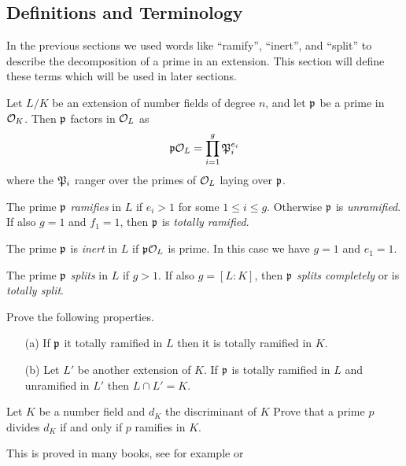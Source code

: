 \subsection{Definitions and Terminology}

In the previous sections we used words like ``ramify'',
``inert'', and ``split'' to describe the decomposition
of a prime in an extension. This section will define these
terms which will be used in later sections.

Let $L/K$ be an extension of number fields of degree $n$,
and let $\p$ be a prime in $\sO_K$. Then $\p$ factors in $\sO_L$ as
\[
  \p\sO_L = \prod_{i=1}^g \P_i^{e_i}
\]
where the $\P_i$ ranger over the primes of $\sO_L$ laying over $\p$.

\begin{definition}\label{def:ramify}
  The prime $\p$ \emph{ramifies} in $L$ if $e_i > 1$ for some $1\leq i\leq g$.
  Otherwise $\p$ is \emph{unramified}.
  If also $g = 1$ and $f_1 = 1$, then $\p$ is \emph{totally ramified}.
\end{definition}

\begin{definition}\label{def:inert}
  The prime $\p$ is \emph{inert} in $L$ if $\p\sO_L$ is prime.
  In this case we have $g = 1$ and $e_1 = 1$.
\end{definition}

\begin{definition}\label{def:split}
  The prime $\p$ \emph{splits} in $L$ if $g > 1$. If also $g = [L : K]$,
  then $\p$ \emph{splits completely} or is \emph{totally split}.
\end{definition}

\begin{exercise}
  Prove the following properties.
  \begin{enumerate}
    \item[(a)] If $\p$ it totally ramified in $L$
    then it is totally ramified in $K$.

    \item[(b)] Let $L'$ be another extension of $K$.
    If $\p$ is totally ramified in $L$ and unramified in $L'$
    then $L\cap L' = K$.
  \end{enumerate}
\end{exercise}

\begin{exercise}
  Let $K$ be a number field and $d_K$ the discriminant of $K$
  Prove that a prime $p$ divides $d_K$ if and only if $p$ ramifies in $K$.

  \begin{hint}
    This is proved in many books, see for example
    \cite[Thm.~24]{marcus1977number} or \cite[Cor.~III.2.12]{neukirch1999}
  \end{hint}
\end{exercise}

